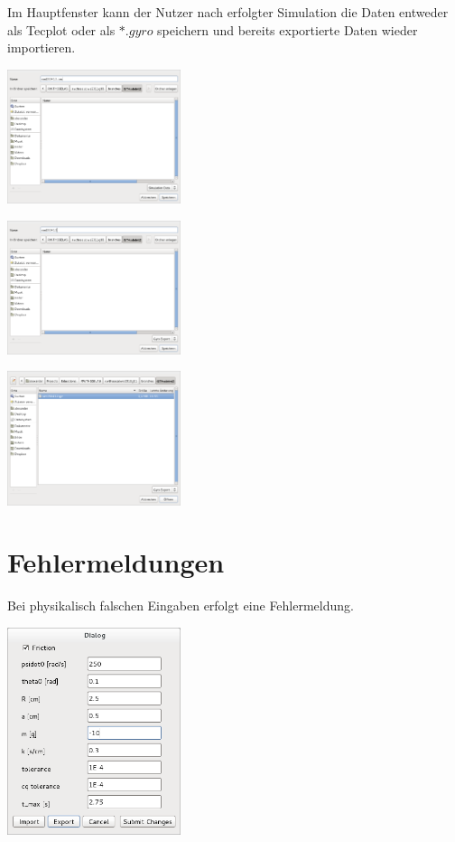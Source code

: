 Im Hauptfenster kann der Nutzer nach erfolgter Simulation die Daten entweder als Tecplot oder als $*.gyro$ speichern und bereits exportierte Daten wieder importieren.

\includegraphics[width=2in,keepaspectratio=true]{figures/exportdialog_tec.png}

\includegraphics[width=2in,keepaspectratio=true]{figures/export_data.png}

\includegraphics[width=2in,keepaspectratio=true]{figures/import_data.png}
\newpage

\section{Fehlermeldungen}
Bei physikalisch falschen Eingaben erfolgt eine Fehlermeldung.

\includegraphics[width=2in,keepaspectratio=true]{figures/change_parameter_negative_mass.png}

